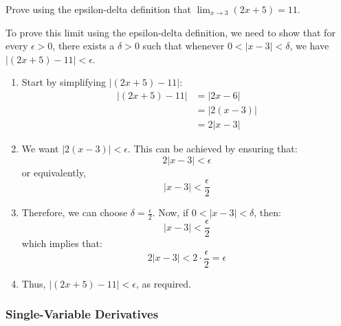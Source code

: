 \begin{example}
Prove using the epsilon-delta definition that \( \lim_{x \to 3} (2x + 5) = 11 \).

\begin{solution}
To prove this limit using the epsilon-delta definition, we need to show that for every \( \epsilon > 0 \), there exists a \( \delta > 0 \) such that whenever \( 0 < |x - 3| < \delta \), we have \( |(2x + 5) - 11| < \epsilon \).

\begin{enumerate}
    \item Start by simplifying \( |(2x + 5) - 11| \):
    \begin{align*}
    |(2x + 5) - 11| &= |2x - 6| \\
    &= |2(x - 3)| \\
    &= 2 |x - 3|
    \end{align*}

    \item We want \( |2(x - 3)| < \epsilon \). This can be achieved by ensuring that:
    \[
    2 |x - 3| < \epsilon
    \]
    or equivalently,
    \[
    |x - 3| < \frac{\epsilon}{2}
    \]

    \item Therefore, we can choose \( \delta = \frac{\epsilon}{2} \). Now, if \( 0 < |x - 3| < \delta \), then:
    \[
    |x - 3| < \frac{\epsilon}{2}
    \]
    which implies that:
    \[
    2 |x - 3| < 2 \cdot \frac{\epsilon}{2} = \epsilon
    \]

    \item Thus, \( |(2x + 5) - 11| < \epsilon \), as required.
\end{enumerate}
\end{solution}
\end{example}
\exampleline

\subsubsection*{Single-Variable Derivatives}

